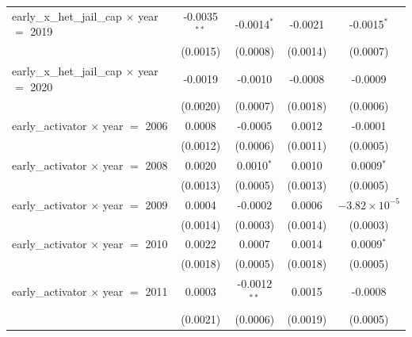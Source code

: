 \begin{tabular}{lcccc}
   early\_x\_het\_jail\_cap $\times$ year $=$ 2019      & -0.0035$^{**}$        & -0.0014$^{*}$             & -0.0021                & -0.0015$^{*}$\\   
                                                        & (0.0015)              & (0.0008)                  & (0.0014)               & (0.0007)\\   
   early\_x\_het\_jail\_cap $\times$ year $=$ 2020      & -0.0019               & -0.0010                   & -0.0008                & -0.0009\\   
                                                        & (0.0020)              & (0.0007)                  & (0.0018)               & (0.0006)\\   
   early\_activator $\times$ year $=$ 2006              & 0.0008                & -0.0005                   & 0.0012                 & -0.0001\\   
                                                        & (0.0012)              & (0.0006)                  & (0.0011)               & (0.0005)\\   
   early\_activator $\times$ year $=$ 2008              & 0.0020                & 0.0010$^{*}$              & 0.0010                 & 0.0009$^{*}$\\   
                                                        & (0.0013)              & (0.0005)                  & (0.0013)               & (0.0005)\\   
   early\_activator $\times$ year $=$ 2009              & 0.0004                & -0.0002                   & 0.0006                 & $-3.82\times 10^{-5}$\\    
                                                        & (0.0014)              & (0.0003)                  & (0.0014)               & (0.0003)\\   
   early\_activator $\times$ year $=$ 2010              & 0.0022                & 0.0007                    & 0.0014                 & 0.0009$^{*}$\\   
                                                        & (0.0018)              & (0.0005)                  & (0.0018)               & (0.0005)\\   
   early\_activator $\times$ year $=$ 2011              & 0.0003                & -0.0012$^{**}$            & 0.0015                 & -0.0008\\   
                                                        & (0.0021)              & (0.0006)                  & (0.0019)               & (0.0005)\\   

\end{tabular}
